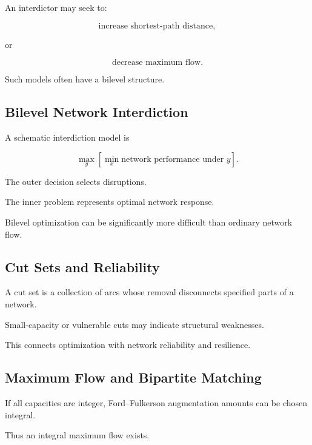 An interdictor may seek to:

\[
\boxed{
\text{increase shortest-path distance},
}
\]

or

\[
\boxed{
\text{decrease maximum flow}.
}
\]

Such models often have a bilevel structure.

\subsection{Bilevel Network Interdiction}
\label{subsec:bilevel-network-interdiction}

A schematic interdiction model is

\[
\boxed{
\max_{y}
\left[
\min_{x}
\text{network performance under }y
\right].
}
\]

The outer decision selects disruptions.

The inner problem represents optimal network response.

Bilevel optimization can be significantly more difficult than ordinary
network flow.

\subsection{Cut Sets and Reliability}
\label{subsec:cut-sets-reliability}

A cut set is a collection of arcs whose removal disconnects specified
parts of a network.

Small-capacity or vulnerable cuts may indicate structural weaknesses.

This connects optimization with network reliability and resilience.

\subsection{Maximum Flow and Bipartite Matching}
\label{subsec:max-flow-matching-integrality}

If all capacities are integer, Ford--Fulkerson augmentation amounts can be
chosen integral.

Thus an integral maximum flow exists.

